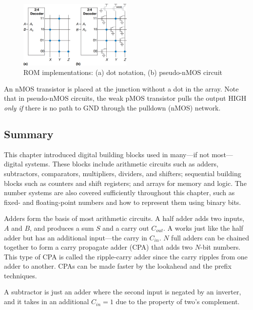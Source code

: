 \documentclass[12pt]{article}
\numberwithin{figure}{subsection}
\numberwithin{table}{subsection}
\numberwithin{equation}{subsection}
\begin{document}
\begin{enumerate}
  \begin{figure}[ht]
    \centering
    \includegraphics[width=0.5\textwidth]{rom_pseudo_nmos_implementation.png}
    \caption{ROM implementations: (a) dot notation, (b) pseudo-nMOS circuit}
    \label{fig:rom_pseudo_nmos_implementation}
  \end{figure}
\end{enumerate}

An nMOS transistor is placed at the junction without a dot in the array. Note that in pseudo-nMOS circuits, the weak pMOS transistor pulls the output HIGH \textit{only if} there is no path to GND through the pulldown (nMOS) network.

\subsection{Summary}

This chapter introduced digital building blocks used in many---if not most---digital systems. These blocks include arithmetic circuits such as adders, subtractors, comparators, multipliers, dividers, and shifters; sequential building blocks such as counters and shift registers; and arrays for memory and logic. The number systems are also covered sufficiently throughout this chapter, such as fixed- and floating-point numbers and how to represent them using binary bits.

Adders form the basis of most arithmetic circuits. A half adder adds two inputs, $A$ and $B$, and produces a sum $S$ and a carry out $C_{out}$. A works just like the half adder but has an additional input---the carry in $C_{in}$. $N$ full adders can be chained together to form a carry propagate adder (CPA) that adds two $N$-bit numbers. This type of CPA is called the ripple-carry adder since the carry ripples from one adder to another. CPAs can be made faster by the lookahead and the prefix techniques.

A subtractor is just an adder where the second input is negated by an inverter, and it takes in an additional $C_{in} = 1$ due to the property of two's complement.
\end{document}
